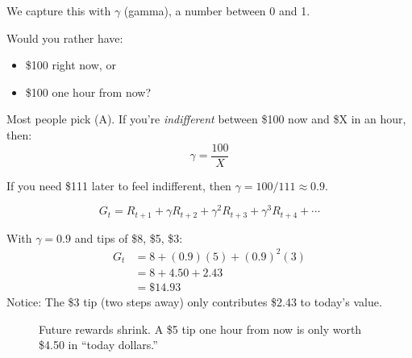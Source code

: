 \documentclass[journal, onecolumn]{IEEEtran}
\begin{document}
We capture this with $\gamma$ (gamma), a number between 0 and 1.

\begin{tcolorbox}[examplebox={The \$100 Test}]
Would you rather have:
\begin{itemize}
    \item[(A)] \$100 right now, or
    \item[(B)] \$100 one hour from now?
\end{itemize}

Most people pick (A). If you're \textit{indifferent} between \$100 now and \$X in an hour, then:
\[ \gamma = \frac{100}{X} \]

If you need \$111 later to feel indifferent, then $\gamma = 100/111 \approx 0.9$.
\end{tcolorbox}

\begin{tcolorbox}[memorybox={Discounted Return Formula}]
\[ G_t = R_{t+1} + \gamma R_{t+2} + \gamma^2 R_{t+3} + \gamma^3 R_{t+4} + \cdots \]

With $\gamma = 0.9$ and tips of \$8, \$5, \$3:
\begin{align*}
G_t &= 8 + (0.9)(5) + (0.9)^2(3) \\
&= 8 + 4.50 + 2.43 \\
&= \$14.93
\end{align*}
Notice: The \$3 tip (two steps away) only contributes \$2.43 to today's value.
\end{tcolorbox}

\begin{figure}[H]
    \centering
    \caption{Future rewards shrink. A \$5 tip one hour from now is only worth \$4.50 in ``today dollars.''}
    \label{fig:timeline}
\end{figure}
\end{document}
